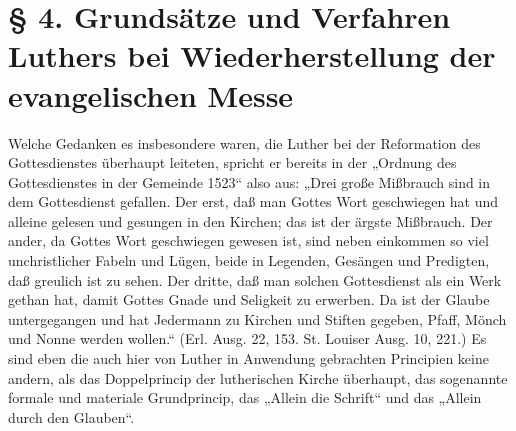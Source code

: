 \chapter[§ 4. Grundsätze und Verfahren Luthers]{§ 4. Grundsätze und Verfahren Luthers bei Wiederherstellung der evangelischen Messe}


Welche Gedanken es insbesondere waren, die Luther bei der Reformation des Gottesdienstes überhaupt leiteten, spricht er bereits in der „Ordnung des Gottesdienstes in der Gemeinde 1523“ also aus: „Drei große Mißbrauch sind in dem Gottesdienst gefallen. Der erst, daß man Gottes Wort geschwiegen hat und alleine gelesen und gesungen in den Kirchen; das ist der ärgste Mißbrauch. Der ander, da Gottes Wort geschwiegen gewesen ist, sind neben einkommen so viel unchristlicher Fabeln und Lügen, beide in Legenden, Gesängen und Predigten, daß greulich ist zu sehen. Der dritte, daß man solchen Gottesdienst als ein Werk gethan hat, damit Gottes Gnade und Seligkeit zu erwerben. Da ist der Glaube untergegangen
und hat Jedermann zu Kirchen und Stiften gegeben, Pfaff, Mönch und Nonne werden wollen.“ (Erl. Ausg. 22, 153. St. Louiser Ausg. 10, 221.) Es sind eben die auch hier von Luther in Anwendung gebrachten Principien keine andern, als das Doppelprincip der lutherischen Kirche überhaupt, das sogenannte formale und materiale Grundprincip, das „Allein die Schrift“ und das „Allein durch den Glauben“.

